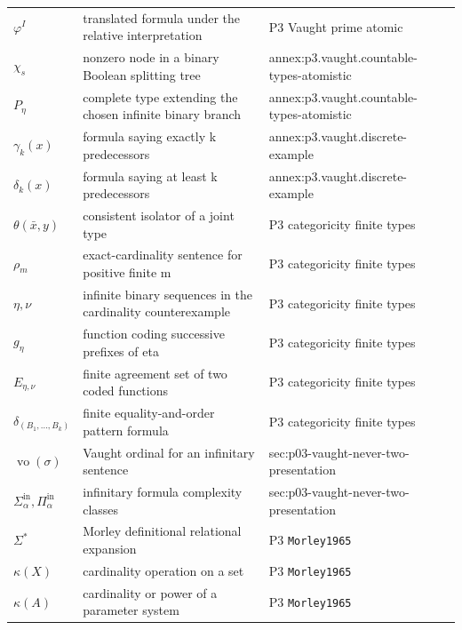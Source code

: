 \begin{longtable}{@{}p{}p{}p{}@{}}
\(\varphi^I\) & translated formula under the relative interpretation & P3 Vaught prime atomic \\
\(\chi_s\) & nonzero node in a binary Boolean splitting tree & annex:\allowbreak{}p3.\allowbreak{}vaught.\allowbreak{}countable-\allowbreak{}types-\allowbreak{}atomistic \\
\(P_\eta\) & complete type extending the chosen infinite binary branch & annex:\allowbreak{}p3.\allowbreak{}vaught.\allowbreak{}countable-\allowbreak{}types-\allowbreak{}atomistic \\
\(\gamma_k(x)\) & formula saying exactly k predecessors & annex:\allowbreak{}p3.\allowbreak{}vaught.\allowbreak{}discrete-\allowbreak{}example \\
\(\delta_k(x)\) & formula saying at least k predecessors & annex:\allowbreak{}p3.\allowbreak{}vaught.\allowbreak{}discrete-\allowbreak{}example \\
\(\theta(\bar x,\allowbreak y)\) & consistent isolator of a joint type & P3 categoricity finite types \\
\(\rho_m\) & exact-cardinality sentence for positive finite m & P3 categoricity finite types \\
\(\eta,\allowbreak \nu\) & infinite binary sequences in the cardinality counterexample & P3 categoricity finite types \\
\(g_\eta\) & function coding successive prefixes of eta & P3 categoricity finite types \\
\(E_{\eta,\nu}\) & finite agreement set of two coded functions & P3 categoricity finite types \\
\(\delta_{(B_1,\ldots,B_k)}\) & finite equality-and-order pattern formula & P3 categoricity finite types \\
\(\operatorname{vo}(\sigma)\) & Vaught ordinal for an infinitary sentence & sec:\allowbreak{}p03-\allowbreak{}vaught-\allowbreak{}never-\allowbreak{}two-\allowbreak{}presentation \\
\(\Sigma^{\mathrm{in}}_\alpha,\allowbreak \Pi^{\mathrm{in}}_\alpha\) & infinitary formula complexity classes & sec:\allowbreak{}p03-\allowbreak{}vaught-\allowbreak{}never-\allowbreak{}two-\allowbreak{}presentation \\
\(\Sigma^*\) & Morley definitional relational expansion & P3 \texttt{Morley1965} \\
\(\kappa(X)\) & cardinality operation on a set & P3 \texttt{Morley1965} \\
\(\kappa(A)\) & cardinality or power of a parameter system & P3 \texttt{Morley1965} \\

\end{longtable}
